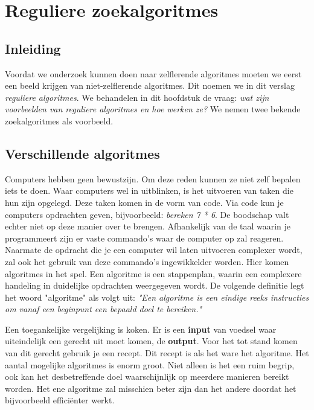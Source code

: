 
\section{Reguliere zoekalgoritmes}

\subsection{Inleiding}
Voordat we onderzoek kunnen doen naar zelflerende algoritmes moeten we eerst een beeld krijgen van niet-zelflerende algoritmes. Dit noemen we in dit verslag \textit{reguliere algoritmes}. We behandelen in dit hoofdstuk de vraag: \textit{wat zijn voorbeelden van reguliere algoritmes en hoe werken ze?} We nemen twee bekende zoekalgoritmes als voorbeeld.


\subsection{Verschillende algoritmes}
Computers hebben geen bewustzijn. Om deze reden kunnen ze niet zelf bepalen iets te doen. Waar computers wel in uitblinken, is het uitvoeren van taken die hun zijn opgelegd. Deze taken komen in de vorm van code. Via code kun je computers opdrachten geven, bijvoorbeeld: \textit{bereken 7 * 6}. De boodschap valt echter niet op deze manier over te brengen. Afhankelijk van de taal waarin je programmeert zijn er vaste commando's waar de computer op zal reageren.
Naarmate de opdracht die je een computer wil laten uitvoeren complexer wordt, zal ook het gebruik van deze commando's ingewikkelder worden. Hier komen algoritmes in het spel. Een algoritme is een stappenplan, waarin een complexere handeling in duidelijke opdrachten weergegeven wordt. De volgende definitie legt het woord "algoritme" als volgt uit: \textit{"Een algoritme is een eindige reeks instructies om vanaf een beginpunt een bepaald doel te bereiken."} \cite{WoordenOrg}

Een toegankelijke vergelijking is koken. Er is een \textbf{input} van voedsel waar uiteindelijk een gerecht uit moet komen, de \textbf{output}. Voor het tot stand komen van dit gerecht gebruik je een recept. Dit recept is als het ware het algoritme.
Het aantal mogelijke algoritmes is enorm groot. Niet alleen is het een ruim begrip, ook kan het desbetreffende doel waarschijnlijk op meerdere manieren bereikt worden. Het ene algoritme zal misschien beter zijn dan het andere doordat het bijvoorbeeld effici\"enter werkt.


